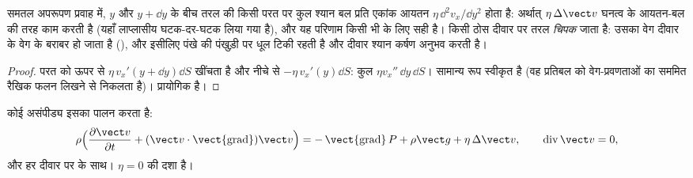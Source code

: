 \begin{proposition}[श्यान बल घनत्व; अ-सर्पण प्रतिबंध]\label{prop:b2:viscous-flows:density}
समतल अपरूपण प्रवाह में, $y$ और $y + \dd y$ के बीच तरल की किसी परत पर
कुल श्यान बल प्रति एकांक आयतन $\eta\,\dd^2v_x/\dd y^2$ होता है: अर्थात्
 $\eta\,\Delta\vect v$ घनत्व के आयतन-बल की तरह काम करती है (यहाँ
लाप्लासीय घटक-दर-घटक लिया गया है), और यह परिणाम किसी भी
 के लिए सही है। किसी ठोस दीवार पर तरल \emph{चिपक} जाता
है: उसका वेग दीवार के वेग के बराबर हो जाता है (\emph{}),
और इसीलिए पंखे की पंखुड़ी पर धूल टिकी रहती है और दीवार श्यान कर्षण अनुभव करती है।
\end{proposition}

\begin{proof}
परत को ऊपर से $\eta\,v_x'(y + \dd y)\dd S$ खींचता है और नीचे से
$-\eta\,v_x'(y)\dd S$: कुल $\eta v_x''\,\dd y\,\dd S$। सामान्य
रूप स्वीकृत है (वह प्रतिबल को वेग-प्रवणताओं का सममित रैखिक फलन लिखने से
निकलता है)। 
प्रायोगिक है।
\end{proof}

\begin{theorem}[नेवियर--स्टोक्स समीकरण]\label{thm:b2:viscous-flows:ns}
कोई असंपीड्य  इसका पालन करता है:
\[
\rho\Bigl(\frac{\partial\vect v}{\partial t} + (\vect v\cdot\operatorname{\vect{grad}})
\vect v\Bigr) = -\operatorname{\vect{grad}}P + \rho\vect g + \eta\,\Delta\vect v ,
\qquad \operatorname{div}\vect v = 0 ,
\]
और हर दीवार पर  के साथ। 
$\eta = 0$ की दशा है।
\end{theorem}
\admitted

